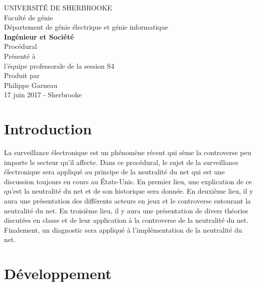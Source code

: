 \documentclass[12pt]{article}
\begin{document}
\begin{titlepage}   
	\large{
		\begin{center}
			UNIVERSITÉ DE SHERBROOKE\\Faculté de génie\\
			Département de génie électrique et génie informatique\\
			\vspace{3cm}
			{\LARGE\textbf{Ingénieur et Société}}\\
			\vspace{2cm}
			\LARGE{Procédural}\\
			\vspace{2cm}
			Présenté à\\l'équipe professorale de la session S4\\
			\vspace{2cm}
			Produit par\\Philippe Garneau\\
			\vspace{1cm}
			\vfill{17 juin 2017 - Sherbrooke}
		\end{center}
	}
\end{titlepage}
\newpage
\tableofcontents

\newpage
\section{Introduction}
La surveillance électronique est un phénomène récent qui sème la controverse peu importe le secteur qu'il affecte. Dans ce procédural, le sujet de la surveillance électronique sera appliqué au principe de la neutralité du net qui est une discussion toujours en cours au États-Unis. En premier lieu, une explication de ce qu'est la neutralité du net et de son historique sera donnée. En deuxième lieu, il y aura une présentation des différents acteurs en jeux et le controverse entourant la neutralité du net. En troisième lieu, il y aura une présentation de divers théories discutées en classe et de leur application à la controverse de la neutralité du net. Finalement, un diagnostic sera appliqué à l'implémentation de la neutralité du net.

\section{Développement}
\end{document}
